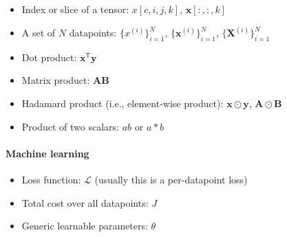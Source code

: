 \documentclass[12pt,letterpaper]{article}
\newcommand{\transpose}{\mathsf{T}}
\newcommand{\hadamard}{\odot}
\begin{document}
\begin{itemize}
\item Index or slice of a tensor: $x[c,i,j,k]$, $\mathbf{x}[:,:,k]$
\item A set of $N$ datapoints: $\{x^{(i)}\}_{i=1}^N$, $\{\mathbf{x}^{(i)}\}_{i=1}^N$, $\{\mathbf{X}^{(i)}\}_{i=1}^N$
\item Dot product: $\mathbf{x}^\transpose\mathbf{y}$
\item Matrix product: $\mathbf{A}\mathbf{B}$
\item Hadamard product (i.e., element-wise product): $\mathbf{x} \hadamard \mathbf{y}$, $\mathbf{A} \hadamard \mathbf{B}$
\item Product of two scalars: $ab$ or $a*b$ 
\end{itemize}

\paragraph{Machine learning}
\begin{itemize}
    \item Loss function: $\mathcal{L}$ (usually this is a per-datapoint loss)
    \item Total cost over all datapoints: $J$
    \item Generic learnable parameters: $\theta$
\end{itemize}
\end{document}
